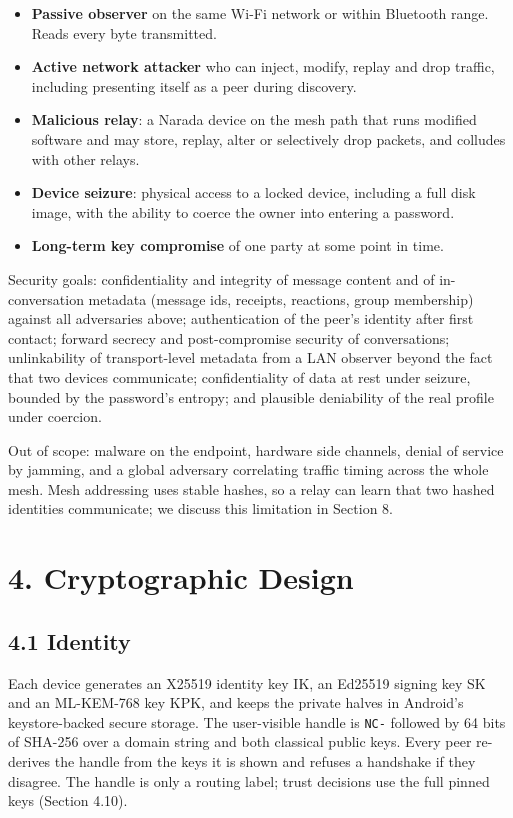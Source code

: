 \documentclass[conference]{IEEEtran}
\begin{document}
\begin{itemize}
  \item \textbf{Passive observer} on the same Wi-Fi network or within Bluetooth range. Reads every byte transmitted.
  \item \textbf{Active network attacker} who can inject, modify, replay and drop traffic, including presenting itself as a peer during discovery.
  \item \textbf{Malicious relay}: a Narada device on the mesh path that runs modified software and may store, replay, alter or selectively drop packets, and colludes with other relays.
  \item \textbf{Device seizure}: physical access to a locked device, including a full disk image, with the ability to coerce the owner into entering a password.
  \item \textbf{Long-term key compromise} of one party at some point in time.
\end{itemize}
Security goals: confidentiality and integrity of message content and of in-conversation metadata (message ids, receipts, reactions, group membership) against all adversaries above; authentication of the peer's identity after first contact; forward secrecy and post-compromise security of conversations; unlinkability of transport-level metadata from a LAN observer beyond the fact that two devices communicate; confidentiality of data at rest under seizure, bounded by the password's entropy; and plausible deniability of the real profile under coercion.

Out of scope: malware on the endpoint, hardware side channels, denial of service by jamming, and a global adversary correlating traffic timing across the whole mesh. Mesh addressing uses stable hashes, so a relay can learn that two hashed identities communicate; we discuss this limitation in Section 8.

\section{4. Cryptographic Design}
\subsection{4.1 Identity}
Each device generates an X25519 identity key IK, an Ed25519 signing key SK and an ML-KEM-768 key KPK, and keeps the private halves in Android's keystore-backed secure storage. The user-visible handle is \texttt{NC-} followed by 64 bits of SHA-256 over a domain string and both classical public keys. Every peer re-derives the handle from the keys it is shown and refuses a handshake if they disagree. The handle is only a routing label; trust decisions use the full pinned keys (Section 4.10).
\end{document}
